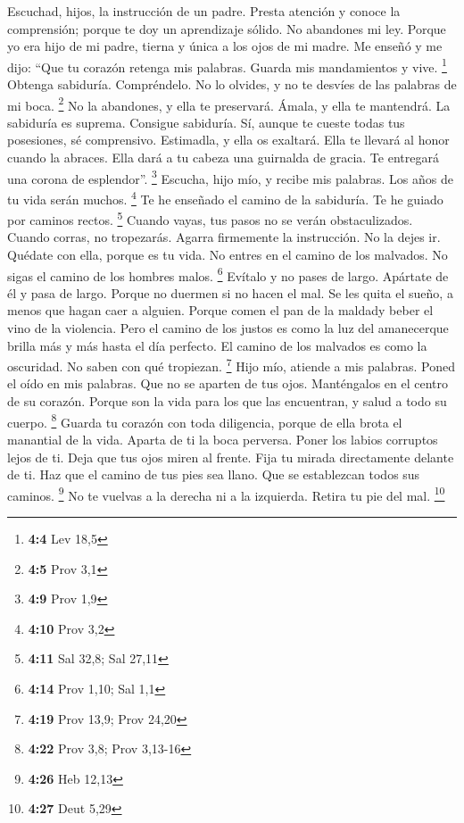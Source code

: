 \begin{paracol}{2}
 Escuchad, hijos, la instrucción de un padre. Presta
atención y conoce la comprensión;  porque te doy un
aprendizaje sólido. No abandones mi ley.  Porque yo era
hijo de mi padre, tierna y única a los ojos de mi madre. 
Me enseñó y me dijo: ``Que tu corazón retenga mis palabras. Guarda mis
mandamientos y vive. \footnote{\textbf{4:4} Lev 18,5} 
Obtenga sabiduría. Compréndelo. No lo olvides, y no te desvíes de las
palabras de mi boca. \footnote{\textbf{4:5} Prov 3,1}  No
la abandones, y ella te preservará. Ámala, y ella te mantendrá.
 La sabiduría es suprema. Consigue sabiduría. Sí, aunque
te cueste todas tus posesiones, sé comprensivo. 
Estimadla, y ella os exaltará. Ella te llevará al honor cuando la
abraces.  Ella dará a tu cabeza una guirnalda de gracia.
Te entregará una corona de esplendor''. \footnote{\textbf{4:9} Prov 1,9}
 Escucha, hijo mío, y recibe mis palabras. Los años de tu
vida serán muchos. \footnote{\textbf{4:10} Prov 3,2}  Te
he enseñado el camino de la sabiduría. Te he guiado por caminos rectos.
\footnote{\textbf{4:11} Sal 32,8; Sal 27,11}  Cuando
vayas, tus pasos no se verán obstaculizados. Cuando corras, no
tropezarás.  Agarra firmemente la instrucción. No la
dejes ir. Quédate con ella, porque es tu vida.  No entres
en el camino de los malvados. No sigas el camino de los hombres malos.
\footnote{\textbf{4:14} Prov 1,10; Sal 1,1}  Evítalo y no
pases de largo. Apártate de él y pasa de largo.  Porque
no duermen si no hacen el mal. Se les quita el sueño, a menos que hagan
caer a alguien.  Porque comen el pan de la maldady beber
el vino de la violencia.  Pero el camino de los justos es
como la luz del amanecerque brilla más y más hasta el día perfecto.
 El camino de los malvados es como la oscuridad. No saben
con qué tropiezan. \footnote{\textbf{4:19} Prov 13,9; Prov 24,20}
 Hijo mío, atiende a mis palabras. Poned el oído en mis
palabras.  Que no se aparten de tus ojos. Manténgalos en
el centro de su corazón.  Porque son la vida para los que
las encuentran, y salud a todo su cuerpo. \footnote{\textbf{4:22} Prov
  3,8; Prov 3,13-16}  Guarda tu corazón con toda
diligencia, porque de ella brota el manantial de la vida.
 Aparta de ti la boca perversa. Poner los labios
corruptos lejos de ti.  Deja que tus ojos miren al
frente. Fija tu mirada directamente delante de ti.  Haz
que el camino de tus pies sea llano. Que se establezcan todos sus
caminos. \footnote{\textbf{4:26} Heb 12,13}  No te
vuelvas a la derecha ni a la izquierda. Retira tu pie del mal.
\footnote{\textbf{4:27} Deut 5,29}


\end{paracol}
